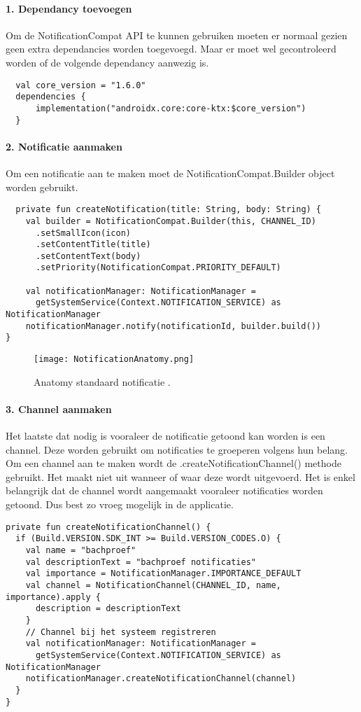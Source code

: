 \paragraph{1. Dependancy toevoegen}
Om de NotificationCompat API te kunnen gebruiken moeten er normaal gezien geen extra dependancies worden toegevoegd.
Maar er moet wel gecontroleerd worden of de volgende dependancy aanwezig is.
\begin{verbatim}
  val core_version = "1.6.0"
  dependencies {
      implementation("androidx.core:core-ktx:$core_version")
  }
\end{verbatim}

\paragraph{2. Notificatie aanmaken}
Om een notificatie aan te maken moet de NotificationCompat.Builder object worden gebruikt. 
\begin{verbatim}
  private fun createNotification(title: String, body: String) {
    val builder = NotificationCompat.Builder(this, CHANNEL_ID)
      .setSmallIcon(icon)
      .setContentTitle(title)
      .setContentText(body)
      .setPriority(NotificationCompat.PRIORITY_DEFAULT)

    val notificationManager: NotificationManager =
      getSystemService(Context.NOTIFICATION_SERVICE) as NotificationManager
    notificationManager.notify(notificationId, builder.build())
}
\end{verbatim}
\begin{figure}[H]
    \centering
    \texttt{[image: NotificationAnatomy.png]}
    \caption{Anatomy standaard notificatie \parencite{One2020}.}
\end{figure}

\paragraph{3. Channel aanmaken}
Het laatste dat nodig is vooraleer de notificatie getoond kan worden is een channel. Deze worden 
gebruikt om notificaties te groeperen volgens hun belang. Om een channel aan te maken wordt  
de .createNotificationChannel() methode gebruikt. Het maakt niet uit wanneer of waar deze wordt uitgevoerd. 
Het is enkel belangrijk dat de channel wordt aangemaakt vooraleer notificaties 
worden getoond. Dus best zo vroeg mogelijk in de applicatie.
\begin{verbatim}
private fun createNotificationChannel() {
  if (Build.VERSION.SDK_INT >= Build.VERSION_CODES.O) {
    val name = "bachproef"
    val descriptionText = "bachproef notificaties"
    val importance = NotificationManager.IMPORTANCE_DEFAULT
    val channel = NotificationChannel(CHANNEL_ID, name, importance).apply {
      description = descriptionText
    }
    // Channel bij het systeem registreren
    val notificationManager: NotificationManager =
      getSystemService(Context.NOTIFICATION_SERVICE) as NotificationManager
    notificationManager.createNotificationChannel(channel)
  }
}
\end{verbatim}

